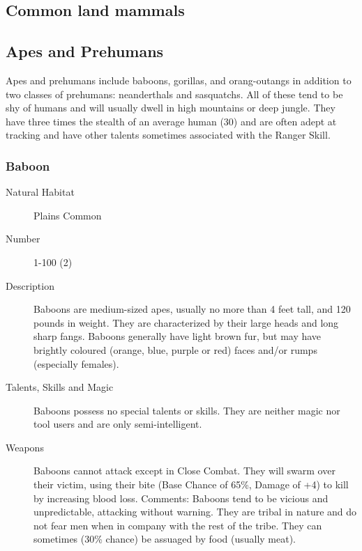 \begin{multicols}{2}

\setlength\columnseprule{0.2mm}

\section{Common land mammals}

\subsection{Apes and Prehumans}
Apes and prehumans include baboons, gorillas, and orang-outangs in
addition to two classes of prehumans: neanderthals and sasquatchs. All
of these tend to be shy of humans and will usually dwell in high
mountains or deep jungle.  They have three times the stealth of an
average human (30) and are often adept at tracking and have other
talents sometimes associated with the Ranger Skill.

\subsubsection{Baboon}

\begin{description}
\item[Natural Habitat] Plains Common

\item[Number] 1-100 (2)

\item[Description] Baboons are medium-sized apes, usually no more than 4
feet tall, and 120 pounds in weight. They are characterized by their
large heads and long sharp fangs.  Baboons generally have light brown
fur, but may have brightly coloured (orange, blue, purple or red)
faces and/or rumps (especially females).

\item[Talents, Skills and Magic] Baboons possess no special talents or skills. They are
neither magic nor tool users and are only semi-intelligent.

\item[Weapons] Baboons cannot attack except in Close Combat.  They will
swarm over their victim, using their bite (Base Chance of 65\%,
Damage of +4) to kill by increasing blood loss.  Comments: Baboons
tend to be vicious and unpredictable, attacking without warning. They
are tribal in nature and do not fear men when in company with the rest
of the tribe.  They can sometimes (30\% chance) be assuaged by
food (usually meat).



\end{description}
\end{multicols}
